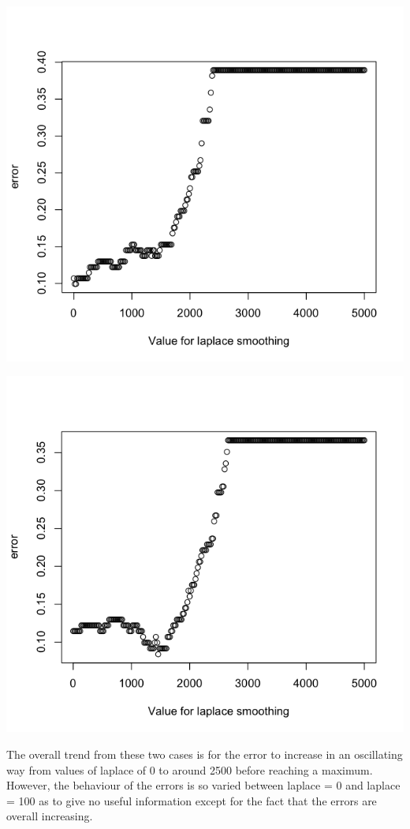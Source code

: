 \documentclass[11pt]{article}
\begin{document}
\begin{enumerate}
\begin{center}
\includegraphics[scale=0.35]{pix/err_1}

\includegraphics[scale=0.35]{pix/err_2}
\end{center}

The overall trend from these two cases is for the error to increase in an oscillating way from values of 
laplace of 0 to around 2500 before reaching a maximum. However, the behaviour of the errors is so varied 
between laplace = 0 and laplace = 100 as to give no useful information except for the fact that the 
errors are overall increasing. 


\end{enumerate}
\end{document}
